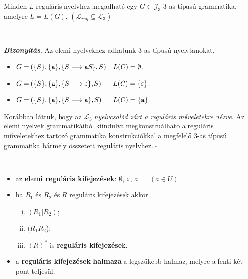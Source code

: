 \begin{tcolorbox}
	\begin{theorem}
		Minden $L$ reguláris nyelvhez megadható egy $G \in \mathcal{G}_3$ 3-as típusú grammatika, amelyre $L=L(G)$. $(\mathcal{L}_{reg} \subseteq \mathcal{L}_3)$
	\end{theorem}
\end{tcolorbox}

~\\[2.5em]

\begin{mdframed}
	\textbf{\textit{Bizonyítás}}. Az elemi nyelvekhez adhatunk 3-as típusú nyelvtanokat.
	\begin{itemize}
		\item $G=(\{S\},\{\verb*|a|\},\{\prodrule{S}{\texttt{a}S}\},S) ~~~ L(G)=\emptyset$. 
		\item $G=(\{S\},\{\verb*|a|\},\{\prodrule{S}{\emptyword}\},S) ~~~~~ L(G)=\{\emptyword\}$.
		\item $G=(\{S\},\{\verb*|a|\},\{\prodrule{S}{\texttt{a}}\},S) ~~~~~ L(G)=\{\texttt{a}\}$.
	\end{itemize}
	
	Korábban láttuk, hogy az $\mathcal{L}_3$ \textit{nyelvcsalád zárt a reguláris műveletekre nézve}.
	Az elemi nyelvek grammatikáiból kiindulva megkonstruálható a reguláris műveletekhez tartozó grammatika konstrukciókkal a megfelelő 3-as típusú grammatika bármely összetett reguláris nyelvhez. $\square$
\end{mdframed}

\begin{tcolorbox}
	\begin{definition}
		~
		\begin{itemize}
			\item az \textbf{elemi reguláris kifejezések}: $\emptyset$, $\varepsilon$, $a$  ~~ $(a \in U)$
			\item ha $R_1$ és $R_2$ és $R$ reguláris kifejezések akkor
			\begin{enumerate}[i)]
				\item $(R_1 | R_2)$;
				\item $(R_1R_2$);
				\item $(R)^*$ is \textbf{reguláris kifejezések}.
			\end{enumerate}
			\item a \textbf{reguláris kifejezések halmaza} a legszűkebb halmaz, melyre a fenti két pont teljesül.
		\end{itemize}
	\end{definition}
\end{tcolorbox}

